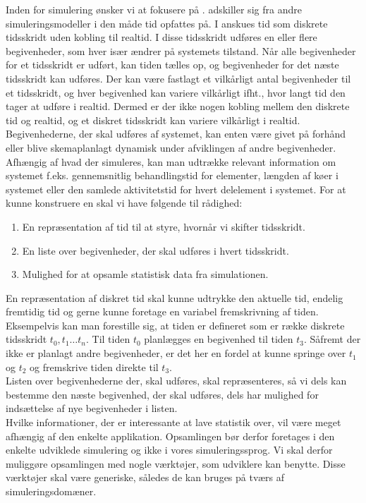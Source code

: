 Inden for simulering ønsker vi at fokusere på \des. \des adskiller sig fra andre simuleringsmodeller i den måde tid opfattes på. I \des anskues tid som diskrete tidsskridt uden kobling til realtid. I disse tidsskridt udføres en eller flere begivenheder, som hver især ændrer på systemets tilstand. Når alle begivenheder for et tidsskridt er udført, kan tiden tælles op, og begivenheder for det næste tidsskridt kan udføres. Der kan være fastlagt et vilkårligt antal begivenheder til et tidsskridt, og hver begivenhed kan variere vilkårligt ifht., hvor langt tid den tager at udføre i realtid. Dermed er der ikke nogen kobling mellem den diskrete tid og realtid, og et diskret tidsskridt kan variere vilkårligt i realtid. Begivenhederne, der skal udføres af systemet, kan enten være givet på forhånd eller blive skemaplanlagt dynamisk under afviklingen af andre begivenheder. 
Afhængig af hvad der simuleres, kan man udtrække relevant information om systemet f.eks. gennemsnitlig behandlingstid for elementer, længden af køer i systemet eller den samlede aktivitetstid for hvert delelement i systemet.
For at kunne konstruere en \des skal vi have følgende til rådighed:
\begin{enumerate}
\tightlist 
\item En repræsentation af tid til at styre, hvornår vi skifter tidsskridt.
\item En liste over begivenheder, der skal udføres i hvert tidsskridt.
\item Mulighed for at opsamle statistisk data fra simulationen. 
\end{enumerate}
En repræsentation af diskret tid skal kunne udtrykke den aktuelle tid, endelig fremtidig tid og gerne kunne foretage en variabel fremskrivning af tiden. Eksempelvis kan man forestille sig, at tiden er defineret som er række diskrete tidsskridt $t_0, t_1 \ldots t_n$. Til tiden $t_{0}$ planlægges en begivenhed til tiden $t_{3}$. Såfremt der ikke er planlagt andre begivenheder, er det her en fordel at kunne springe over $t_{1}$ og $t_{2}$ og fremskrive tiden direkte til $t_{3}$. \\  
Listen over begivenhederne der, skal udføres, skal repræsenteres, så vi dels kan bestemme den næste begivenhed, der skal udføres, dels har mulighed for indsættelse af nye begivenheder i listen. \\
Hvilke informationer, der er interessante at lave statistik over, vil være meget afhængig af den enkelte applikation. Opsamlingen bør derfor foretages i den enkelte udviklede simulering og ikke i vores simuleringssprog. Vi skal derfor muliggøre opsamlingen med nogle værktøjer, som udviklere kan benytte. Disse værktøjer skal være generiske, således de kan bruges på tværs af simuleringsdomæner. 




